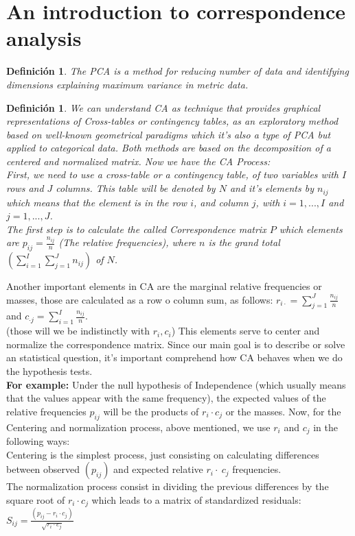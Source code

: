 \documentclass[12pt]{extarticle}
\newtheorem{definition}[theorem]{Definici\'{o}n}
\numberwithin{equation}{section}
\newcommand{\Dsum}{\displaystyle\sum}
\begin{document}
\section{An introduction to correspondence analysis}
\begin{definition}
The PCA is a method for reducing number of data and identifying dimensions explaining maximum variance in metric data. 
\end{definition}
\begin{definition}
We can understand CA as technique that provides graphical representations of Cross-tables or contingency tables, as an exploratory method based on well-known geometrical paradigms which it's also a type of PCA but applied to categorical data. Both methods are based on the decomposition of a centered and normalized matrix.
Now we have the CA Process:\\
First, we need to use a cross-table or a contingency table, of two variables with $I$ rows and $J$ columns. This table will be denoted by $N$ and it's elements by $n_{ij}$ which means that the element is in the row $i$, and column $j$, with $i = 1,...,I$ and $j = 1,...,J$. \\
The first step is to calculate the called \textit{Correspondence matrix} $P$ which elements are $p_{ij} = \frac{n_{ij}}{n}$ (The relative frequencies), where $n$ is the grand total$\left( \Dsum_{i=1}^I \Dsum_{j=1}^J n_{ij}  \right)$ of  $N$.\\
\end{definition}
Another important elements in CA are the marginal relative frequencies or masses, those are calculated as a row o column sum, as follows: 
$r_{i \cdot} = \displaystyle \sum_{j=1}^J \frac{n_{ij}}{n}$ and $c_{\cdot j} = \displaystyle \sum_{i=1}^I \frac{n_{ij}}{n}$.\\
(those will we be indistinctly with $r_i,c_i$) This elements serve to center and normalize the correspondence matrix.
Since our main goal is to describe or solve an statistical question, it's  important comprehend how CA behaves when we do the hypothesis tests. \\
\textbf{For example:} Under the null hypothesis of Independence (which usually means that the values appear with the same frequency), the expected values of the relative frequencies $p_{ij}$ will be the products of $r_i \cdot c_j$ or the masses. 
Now, for the Centering and normalization process, above mentioned, we use $r_i$ and $c_j$ in the following ways: \\
Centering is the simplest process, just consisting on calculating differences between observed $(p_{ij})$ and expected relative  $r_i \cdot \ c_j$ frequencies. \\
The normalization process consist in dividing the previous differences by the square root of  $r_i \cdot c_j$  which leads to a matrix of standardized residuals: $S_{ij} = \frac{ ( p_{ij} -  r_i \cdot c_j) }{\sqrt{  r_i \cdot c_j}}$
\end{document}
